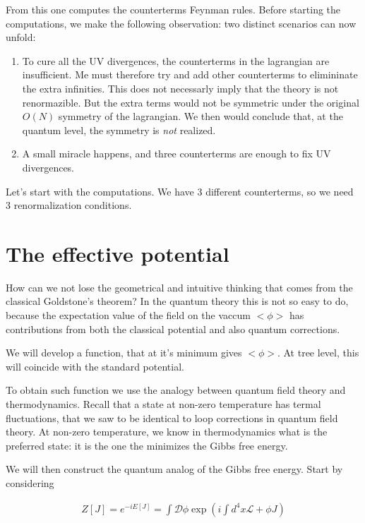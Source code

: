\documentclass[11pt]{report}
\begin{document}
From this one computes the counterterms Feynman rules. Before starting the computations, we make the following observation: two distinct scenarios can now unfold: 

\begin{enumerate}
    \item To cure all the UV divergences, the counterterms in the lagrangian are insufficient. Me must therefore try and add other counterterms to elimininate the extra infinities. This does not necessarly imply that the theory is not renormazible. But the extra terms would not be symmetric under the original \(O(N)\) symmetry of the lagrangian. We then would conclude that, at the quantum level, the symmetry is \emph{not} realized. 
    \item A small miracle happens, and three counterterms are enough to fix UV divergences. 
\end{enumerate}

Let's start with the computations. We have 3 different counterterms, so we need 3 renormalization conditions. 

\section{The effective potential}

How can we not lose the geometrical and intuitive thinking that comes from the classical Goldstone's theorem? In the quantum theory this is not so easy to do, because the expectation value of the field on the vaccum \(<\phi>\) has contributions from both the classical potential and also quantum corrections. 

We will develop a function, that at it's minimum gives \(<\phi>\). At tree level, this will coincide with the standard potential. 

To obtain such function we use the analogy between quantum field theory and thermodynamics. Recall that a state at non-zero temperature has termal fluctuations, that we saw to be identical to loop corrections in quantum field theory. At non-zero temperature, we know in thermodynamics what is the preferred state: it is the one the minimizes the Gibbs free energy. 

We will then construct the quantum analog of the Gibbs free energy. Start by considering 

\begin{align}
    Z[J] = e^{-iE[J]} = \int \mathcal{D}\phi \exp\left(i \int d^4x \mathcal{L} + \phi J\right)
\end{align}
\end{document}
